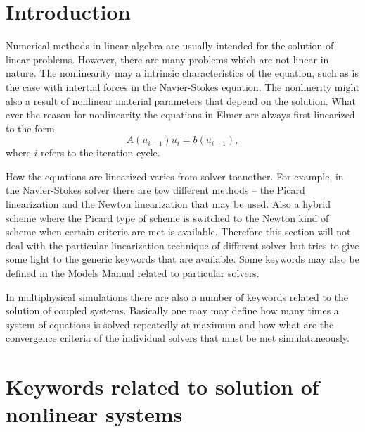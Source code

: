 \noindent

\begin{versiona}

\section{Introduction}

Numerical methods in linear algebra are usually intended for the solution of linear
problems. However, there are many problems which are not linear in nature. The nonlinearity 
may a intrinsic characteristics of the equation, such as is the case with intertial forces
in the Navier-Stokes equation. The nonlinerity might also a result of nonlinear material parameters
that depend on the solution. What ever the reason for nonlinearity the equations in Elmer are 
always first linearized to the form
\begin{equation}\label{ModelLinearSystem}
A(u_{i-1})u_i = b(u_{i-1}),
\end{equation}
where $i$ refers to the iteration cycle. 

How the equations are linearized varies from solver toanother. For example, in the Navier-Stokes 
solver there are tow different methods -- the Picard linearization and the Newton linearization that 
may be used. Also a hybrid scheme where the Picard type of scheme is switched to the 
Newton kind of scheme when certain criteria are met is available. Therefore this section will
not deal with the particular linearization technique of different solver but tries to 
give some light to the generic keywords that are available. Some keywords may also be defined
in the Models Manual related to particular solvers. 

In multiphysical simulations there are also a number of keywords related to 
the solution of coupled systems. Basically one may may define how many times a 
system of equations is solved repeatedly at maximum and how what are the convergence
criteria of the individual solvers that must be met simulataneously.

\section{Keywords related to solution of nonlinear systems}

\end{versiona}

